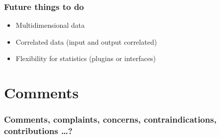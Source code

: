 \documentclass{beamer}
\begin{document}
\begin{frame}
  \frametitle{Future things to do}
  \begin{itemize}
  \item Multidimensional data
  \item Correlated data (input and output correlated)
  \item Flexibility for statistics (plugins or interfaces)
  \end{itemize}
\end{frame}

\section{Comments}

\begin{frame}
  \frametitle{Comments, complaints, concerns, contraindications, contributions \ldots ?}
\end{frame}
\end{document}
